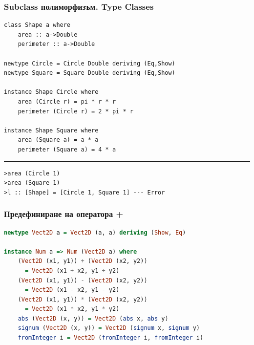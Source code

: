 \documentclass{beamer}
\begin{document}
\begin{frame}[fragile]
\frametitle{Subclass полиморфизъм. Type Classes}

\begin{lstlisting}[basicstyle=\tiny]
class Shape a where
    area :: a->Double
    perimeter :: a->Double

newtype Circle = Circle Double deriving (Eq,Show)
newtype Square = Square Double deriving (Eq,Show)

instance Shape Circle where
    area (Circle r) = pi * r * r
    perimeter (Circle r) = 2 * pi * r

instance Shape Square where
    area (Square a) = a * a
    perimeter (Square a) = 4 * a
\end{lstlisting}

\begin{center}
\noindent\rule{6cm}{0.4pt}
\end{center}

\begin{lstlisting}[basicstyle=\tiny]
>area (Circle 1)
>area (Square 1)
>l :: [Shape] = [Circle 1, Square 1] --- Error
\end{lstlisting}

\end{frame}



\begin{frame}[fragile]
\frametitle{Предефиниране на оператора +}

\begin{lstlisting}[basicstyle=\small,language=haskell]
newtype Vect2D a = Vect2D (a, a) deriving (Show, Eq)

instance Num a => Num (Vect2D a) where
    (Vect2D (x1, y1)) + (Vect2D (x2, y2)) 
      = Vect2D (x1 + x2, y1 + y2)
    (Vect2D (x1, y1)) - (Vect2D (x2, y2)) 
      = Vect2D (x1 - x2, y1 - y2)
    (Vect2D (x1, y1)) * (Vect2D (x2, y2)) 
      = Vect2D (x1 * x2, y1 * y2)
    abs (Vect2D (x, y)) = Vect2D (abs x, abs y)
    signum (Vect2D (x, y)) = Vect2D (signum x, signum y)
    fromInteger i = Vect2D (fromInteger i, fromInteger i)
\end{lstlisting}


\end{frame}
\end{document}
